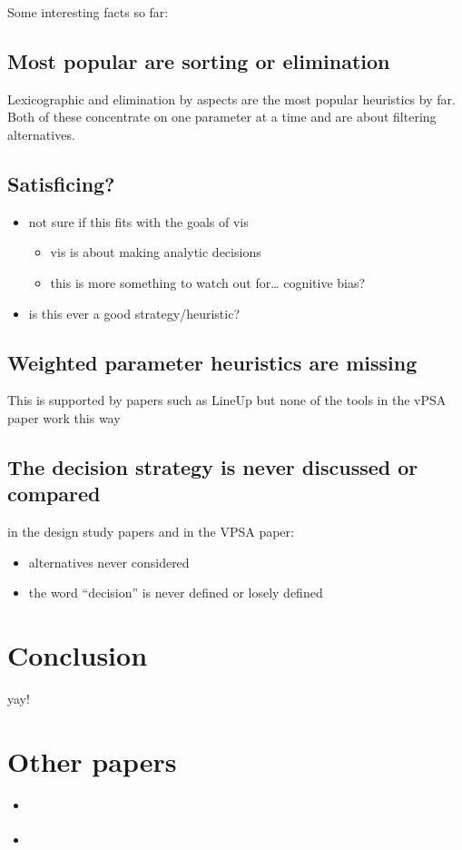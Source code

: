 Some interesting facts so far:

\subsection{Most popular are sorting or
elimination}\label{most-popular-are-sorting-or-elimination}

Lexicographic and elimination by aspects are the most popular heuristics
by far. Both of these concentrate on one parameter at a time and are
about filtering alternatives.

\subsection{Satisficing?}\label{satisficing-1}

\begin{itemize}
\tightlist
\item
  not sure if this fits with the goals of vis

  \begin{itemize}
  \tightlist
  \item
    vis is about making analytic decisions
  \item
    this is more something to watch out for\ldots{} cognitive bias?
  \end{itemize}
\item
  is this ever a good strategy/heuristic? 
\end{itemize}

\subsection{Weighted parameter heuristics are
missing}\label{weighted-parameter-heuristics-are-missing}

This is supported by papers such as LineUp \citep{Gratzl:2013} but none
of the tools in the vPSA paper work this way

\subsection{The decision strategy is never discussed or
compared}\label{the-decision-strategy-is-never-discussed-or-compared}

in the design study papers and in the VPSA paper:

\begin{itemize}
\tightlist
\item
  alternatives never considered
\item
  the word ``decision'' is never defined or losely defined
\end{itemize}

\section{Conclusion}\label{conclusion}

yay!

\section{Other papers}\label{other-papers}

\begin{itemize}
\tightlist
\item
  \citep{Berger:2010}
\item
  \citep{Gratzl:2013}
\end{itemize}
